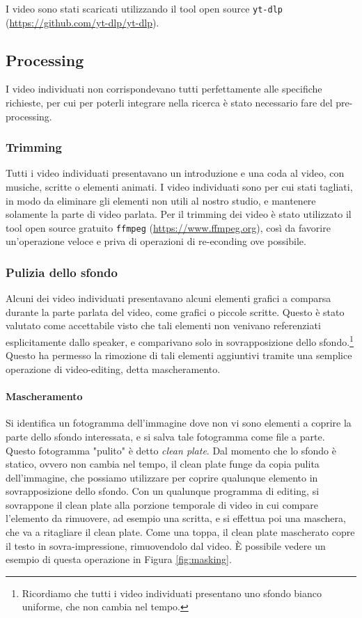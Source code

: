 I video sono stati scaricati utilizzando il tool open source \verb|yt-dlp| (\url{https://github.com/yt-dlp/yt-dlp}).

\subsection{Processing}

I video individuati non corrispondevano tutti perfettamente alle specifiche richieste, per cui per poterli integrare nella ricerca è stato necessario fare del pre-processing.

\subsubsection{Trimming}

Tutti i video individuati presentavano un introduzione e una coda al video, con musiche, scritte o elementi animati. I video individuati sono per cui stati tagliati, in modo da eliminare gli elementi non utili al nostro studio, e mantenere solamente la parte di video parlata. Per il trimming dei video è stato utilizzato il tool open source gratuito \verb|ffmpeg| (\url{https://www.ffmpeg.org}), così da favorire un'operazione veloce e priva di operazioni di re-econding ove possibile.

\subsubsection{Pulizia dello sfondo}

Alcuni dei video individuati presentavano alcuni elementi grafici a comparsa durante la parte parlata del video, come grafici o piccole scritte. Questo è stato valutato come accettabile visto che tali elementi non venivano referenziati esplicitamente dallo speaker, e comparivano solo in sovrapposizione dello sfondo.\footnote{Ricordiamo che tutti i video individuati presentano uno sfondo bianco uniforme, che non cambia nel tempo.} Questo ha permesso la rimozione di tali elementi aggiuntivi tramite una semplice operazione di video-editing, detta mascheramento.

\paragraph{Mascheramento}

Si identifica un fotogramma dell'immagine dove non vi sono elementi a coprire la parte dello sfondo interessata, e si salva tale fotogramma come file a parte. Questo fotogramma "pulito" è detto \textit{clean plate}. Dal momento che lo sfondo è statico, ovvero non cambia nel tempo, il clean plate funge da copia pulita dell'immagine, che possiamo utilizzare per coprire qualunque elemento in sovrapposizione dello sfondo. Con un qualunque programma di editing, si sovrappone il clean plate alla porzione temporale di video in cui compare l'elemento da rimuovere, ad esempio una scritta, e si effettua poi una maschera, che va a ritagliare il clean plate. Come una toppa, il clean plate mascherato copre il testo in sovra-impressione, rimuovendolo dal video. È possibile vedere un esempio di questa operazione in Figura \ref{fig:masking}.

